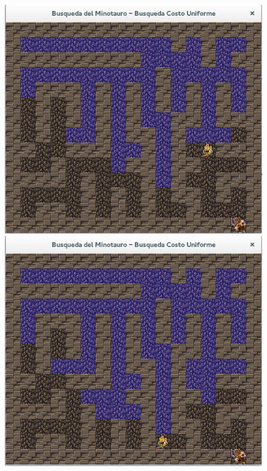 \documentclass[letter, titlepage, 10pt]{article}
\begin{document}
\begin{appendices}
        \begin{figure}[H]
  \centering
    \begin{minipage}{.5\textwidth}
        \centering
        \includegraphics[width=0.8\linewidth]{images/bcu_01}
    \end{minipage}%
    \begin{minipage}{.5\textwidth}
        \centering
        \includegraphics[width=0.8\linewidth]{images/bcu_02}
    \end{minipage}
\end{figure}


\end{appendices}
\end{document}

